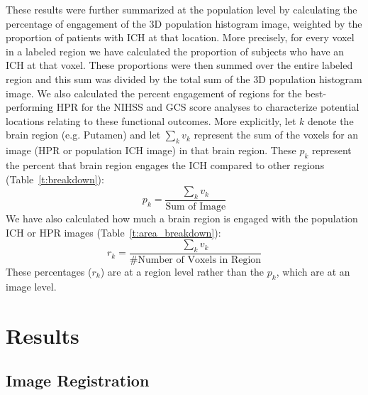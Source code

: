 \documentclass[10pt]{article}\usepackage[]{graphicx}\usepackage[]{color}
\begin{document}
These results were further summarized at the population level by calculating the percentage of engagement of the 3D population histogram image, weighted by the proportion of patients with ICH at that location.  More precisely, for every voxel in a labeled region we have calculated the proportion of subjects who have an ICH at that voxel. These proportions were then summed over the entire labeled region and this sum was divided by the total sum of the 3D population histogram image.
We also calculated the percent engagement of regions for the best-performing HPR for the NIHSS and GCS score analyses to characterize potential locations relating to these functional outcomes.  
More explicitly, let $k$ denote the brain region (e.g. Putamen) and let $\sum_{k} v_{k}$ represent the sum of the voxels for an image (HPR or population ICH image) in that brain region. These $p_{k}$ represent the percent that brain region engages the ICH compared to other regions (Table~\ref{t:breakdown}):
$$
	p_{k} = \frac{\sum_{k} v_{k}}{\text{Sum of Image}}
$$
We have also calculated how much a brain region is engaged with the population ICH or HPR images (Table~\ref{t:area_breakdown}):
$$
	r_{k} = \frac{\sum_{k} v_{k}}{\# \text{Number of Voxels in Region}}
$$
These percentages ($r_{k}$) are at a region level rather than the $p_k$, which are at an image level.





\section{Results}


\subsection{Image Registration}
\end{document}
